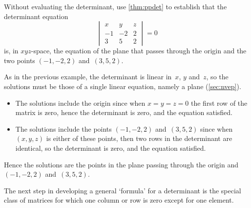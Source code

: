 \begin{example} \label{eg:planeq}
Without evaluating the determinant, use \autoref{thm:ppdet} to establish that the determinant equation
\begin{equation*}
\begin{vmatrix} x&y&z\\-1&-2&2\\3&5&2 \end{vmatrix}=0
\end{equation*}
is, in \(xyz\)-space, the equation of the plane that passes through the origin and the two points \((-1,-2,2)\) and~\((3,5,2)\).
\begin{solution} 
As in the previous example, the determinant is linear in~\(x\), \(y\) and~\(z\), so the solutions must be those of a single linear equation, namely a plane (\autoref{sec:nvep}).
\begin{itemize}
\item The solutions include the origin since when \(x=y=z=0\) the first row of the matrix is zero, hence the determinant is zero, and the equation satisfied.
\item The solutions include the  points \((-1,-2,2)\) and~\((3,5,2)\) since when \((x,y,z)\) is either of these points, then two rows in the determinant are identical, so the determinant is zero, and the equation satisfied.
\end{itemize}
Hence the solutions are the points in the plane passing through the origin and \((-1,-2,2)\) and~\((3,5,2)\).
\end{solution}
\end{example}






The next step in developing a general `formula' for a determinant is the special class of matrices for which one column or row is zero except for one element.



